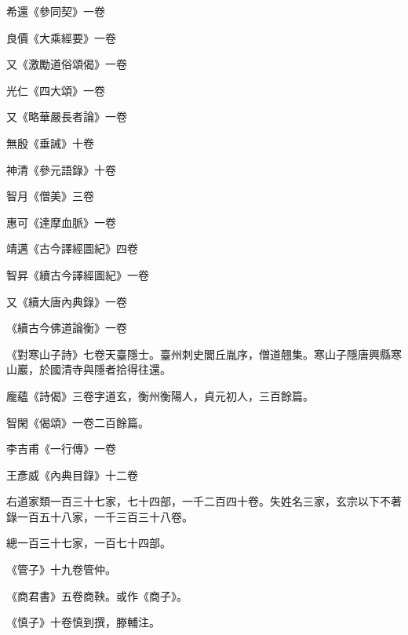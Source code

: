 \begin{pinyinscope}
 希還《參同契》一卷



 良價《大乘經要》一卷



 又《激勵道俗頌偈》一卷



 光仁《四大頌》一卷



 又《略華嚴長者論》一卷



 無殷《垂誡》十卷



 神清《參元語錄》十卷



 智月《僧美》三卷



 惠可《達摩血脈》一卷



 靖邁《古今譯經圖紀》四卷



 智昇《續古今譯經圖紀》一卷



 又《續大唐內典錄》一卷



 《續古今佛道論衡》一卷



 《對寒山子詩》七卷天臺隱士。臺州刺史閭丘胤序，僧道翹集。寒山子隱唐興縣寒山巖，於國清寺與隱者拾得往還。



 龐蘊《詩偈》三卷字道玄，衡州衡陽人，貞元初人，三百餘篇。



 智閑《偈頌》一卷二百餘篇。



 李吉甫《一行傳》一卷



 王彥威《內典目錄》十二卷



 右道家類一百三十七家，七十四部，一千二百四十卷。失姓名三家，玄宗以下不著錄一百五十八家，一千三百三十八卷。



 總一百三十七家，一百七十四部。



 《管子》十九卷管仲。



 《商君書》五卷商鞅。或作《商子》。



 《慎子》十卷慎到撰，滕輔注。




\end{pinyinscope}
